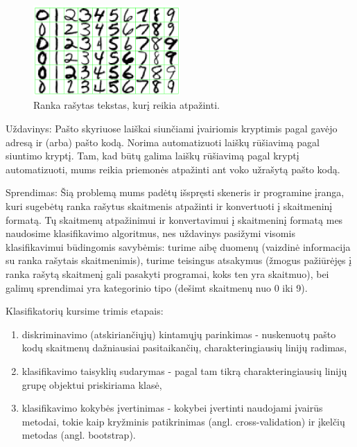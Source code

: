 \begin{figure}[htb]
\begin{center}
\leavevmode
\includegraphics[width=0.5\textwidth]{images/ranka_rasyti_skaiciai.png}
\end{center}
\caption{Ranka rašytas tekstas, kurį reikia atpažinti.}
\label{fig:flash}
\end{figure}

Uždavinys: Pašto skyriuose laiškai siunčiami įvairiomis kryptimis pagal gavėjo
adresą ir (arba) pašto kodą. Norima automatizuoti laiškų rūšiavimą pagal
siuntimo kryptį. Tam, kad būtų galima laiškų rūšiavimą pagal kryptį
automatizuoti, mums reikia priemonės atpažinti ant voko užrašytą
pašto kodą.

Sprendimas: Šią problemą mums padėtų išspręsti skeneris ir programine įranga,
kuri sugebėtų ranka rašytus skaitmenis atpažinti ir konvertuoti į skaitmeninį
formatą. Tų skaitmenų atpažinimui ir konvertavimui į skaitmeninį formatą
mes naudosime klasifikavimo algoritmus, nes uždavinys pasižymi
visomis klasifikavimui būdingomis savybėmis: turime aibę duomenų (vaizdinė
informacija su ranka rašytais skaitmenimis), turime teisingus atsakymus (žmogus
pažiūrėjęs į ranka rašytą skaitmenį gali pasakyti programai, koks ten yra
skaitmuo), bei galimų sprendimai yra kategorinio tipo (dešimt skaitmenų nuo
0 iki 9).

Klasifikatorių kursime trimis etapais:
\begin{enumerate}
  \item diskriminavimo (atskiriančiųjų) kintamųjų parinkimas - nuskenuotų
  pašto kodų skaitmenų dažniausiai pasitaikančių, charakteringiausių linijų
  radimas,
  \item klasifikavimo taisyklių sudarymas - pagal tam tikrą charakteringiausių
  linijų grupę objektui priskiriama klasė,
  \item klasifikavimo kokybės įvertinimas - kokybei įvertinti naudojami įvairūs
  metodai, tokie kaip kryžminis patikrinimas (angl. cross-validation) ir
  įkelčių metodas (angl. bootstrap).
\end{enumerate}

